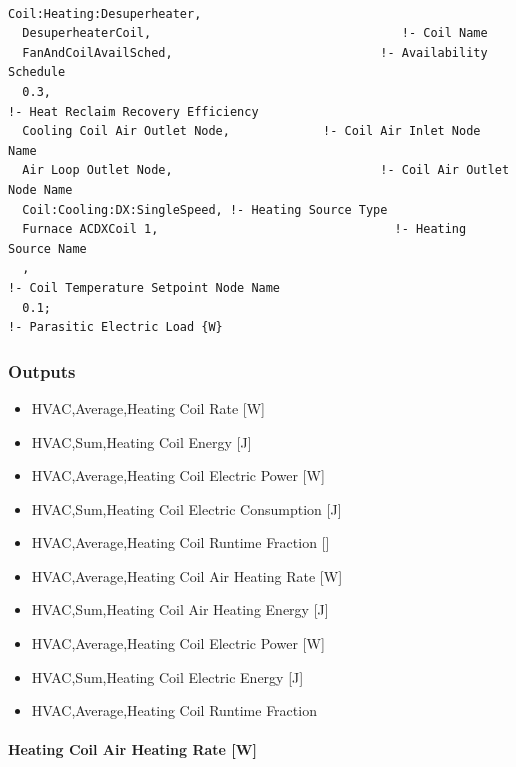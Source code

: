 \begin{lstlisting}

Coil:Heating:Desuperheater,
  DesuperheaterCoil,                                   !- Coil Name
  FanAndCoilAvailSched,                             !- Availability Schedule
  0.3,                                                               !- Heat Reclaim Recovery Efficiency
  Cooling Coil Air Outlet Node,             !- Coil Air Inlet Node Name
  Air Loop Outlet Node,                             !- Coil Air Outlet Node Name
  Coil:Cooling:DX:SingleSpeed, !- Heating Source Type
  Furnace ACDXCoil 1,                                 !- Heating Source Name
  ,                                                                     !- Coil Temperature Setpoint Node Name
  0.1;                                                               !- Parasitic Electric Load {W}
\end{lstlisting}

\subsubsection{Outputs}\label{outputs-4-006}

\begin{itemize}
\item
  HVAC,Average,Heating Coil Rate {[}W{]}
\item
  HVAC,Sum,Heating Coil Energy {[}J{]}
\item
  HVAC,Average,Heating Coil Electric Power {[}W{]}
\item
  HVAC,Sum,Heating Coil Electric Consumption {[}J{]}
\item
  HVAC,Average,Heating Coil Runtime Fraction {[]}
\item
  HVAC,Average,Heating Coil Air Heating Rate {[}W{]}
\item
  HVAC,Sum,Heating Coil Air Heating Energy {[}J{]}
\item
  HVAC,Average,Heating Coil Electric Power {[}W{]}
\item
  HVAC,Sum,Heating Coil Electric Energy {[}J{]}
\item
  HVAC,Average,Heating Coil Runtime Fraction
\end{itemize}

\paragraph{Heating Coil Air Heating Rate {[}W{]}}\label{heating-coil-air-heating-rate-w-1}

